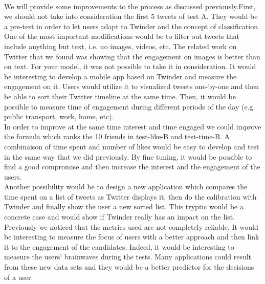 \paragraph{}
We will provide some improvements to the process as discussed previously.First, we should not take into consideration the first 5 tweets of test A. They would be a pre-test in order to let users adapt to Twinder and the concept of classification. One of the most important modifications would be to filter out tweets that include anything but text, i.e. no images, videos, etc. The related work on Twitter that we found was showing that the engagement on images is better than on text. For your model, it was not possible to take it in consideration.
It would be interesting to develop a mobile app based on Twinder and measure the engagement on it. Users would utilize it to visualized tweets one-by-one and then be able to sort their Twitter timeline at the same time. Then, it would be possible to measure time of engagement during different periods of the day (e.g. public transport, work, home, etc). \\
In order to improve at the same time interest and time engaged we could improve the formula which ranks the 10 friends in test-like-B and test-time-B. A combinaison of time spent and number of likes would be easy to develop and test in the same way that we did previously. By fine tuning, it would be possible to find a good compromise and then increase the interest and the engagement of the users. \\
Another possibility would be to design a new application which compares the time spent on a list of tweets as Twitter displays it, then do the calibration with Twinder and finally show the user a new sorted list. This tryptic would be a concrete case and would show if Twinder really has an impact on the list. \\
Previously we noticed that the metrics used are not completely reliable. It would be interesting to measure the focus of users with a better approach and then link it to the engagement of the candidates. Indeed, it would be interesting to measure the users' brainwaves during the tests. Many applications could result from these new data sets and they would be a better predictor for the decisions of a user.






